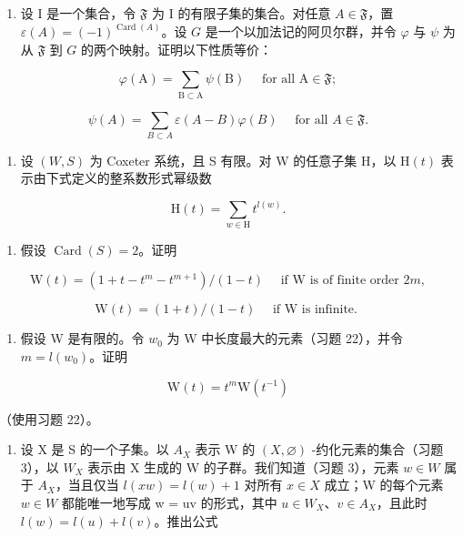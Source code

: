 \begin{enumerate}
\def\labelenumi{\arabic{enumi})}
\setcounter{enumi}{24}
\tightlist
\item
  设 I 是一个集合，令 \(\mathfrak{F}\) 为 I 的有限子集的集合。对任意 \(A \in \mathfrak{F}\)，置 \(\varepsilon(A) = (-1)^{\operatorname{Card}(A)}\)。设 \(G\) 是一个以加法记的阿贝尔群，并令 \(\varphi\) 与 \(\psi\) 为从 \(\mathfrak{F}\) 到 \(G\) 的两个映射。证明以下性质等价：
\end{enumerate}

\[
\varphi (\mathrm{A}) = \sum_ {\mathrm{B} \subset \mathrm{A}} \psi (\mathrm{B}) \quad \text {   for   all   } \mathrm{A} \in \mathfrak {F};\tag{i}
\]

\[
\psi (A) = \sum_ {B \subset A} \varepsilon (A - B) \varphi (B) \quad \text {   for   all   } A \in \mathfrak {F}.\tag{ii}
\]

\begin{enumerate}
\def\labelenumi{\arabic{enumi})}
\setcounter{enumi}{25}
\tightlist
\item
  设 \((W, S)\) 为 Coxeter 系统，且 S 有限。对 W 的任意子集 H，以 \(\mathrm{H}(t)\) 表示由下式定义的整系数形式幂级数
\end{enumerate}

\[
\mathrm{H} (t) = \sum_ {w \in \mathrm{H}} t ^ {l (w)}.
\]

\begin{enumerate}
\def\labelenumi{\alph{enumi})}
\tightlist
\item
  假设 \(\operatorname{Card}(S) = 2\)。证明
\end{enumerate}

\[
\mathrm{W} (t) = \left(1 + t - t ^ {m} - t ^ {m + 1}\right) / (1 - t) \quad \text { if   } \mathrm{W} \text {   is   of   finite   order   } 2 m,
\]

\[
\mathrm{W} (t) = (1 + t) / (1 - t) \quad \text { if   } \mathrm{W} \text {   is   infinite. }
\]

\begin{enumerate}
\def\labelenumi{\alph{enumi})}
\setcounter{enumi}{1}
\tightlist
\item
  假设 W 是有限的。令 \(w_0\) 为 W 中长度最大的元素（习题 22），并令 \(m = l(w_0)\)。证明
\end{enumerate}

\[
\mathrm{W} (t) = t ^ {m} \mathrm{W} (t ^ {- 1})
\]

（使用习题 22）。

\begin{enumerate}
\def\labelenumi{\alph{enumi})}
\setcounter{enumi}{2}
\tightlist
\item
  设 X 是 S 的一个子集。以 \(A_{X}\) 表示 W 的 \((X,\varnothing)\) -约化元素的集合（习题 3），以 \(W_{X}\) 表示由 X 生成的 W 的子群。我们知道（习题 3），元素 \(w \in W\) 属于 \(A_{X}\)，当且仅当 \(l(xw) = l(w) + 1\) 对所有 \(x \in X\) 成立；W 的每个元素 \(w \in W\) 都能唯一地写成 w = uv 的形式，其中 \(u \in W_{X}\)、\(v \in A_{X}\)，且此时 \(l(w) = l(u) + l(v)\)。推出公式
\end{enumerate}


